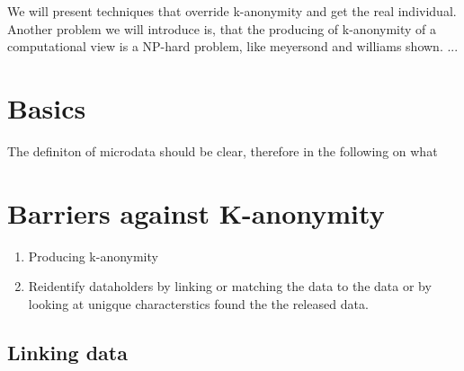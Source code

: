 \documentclass{llncs}
\begin{document}
We will present techniques that override k-anonymity and get the real individual. Another problem we will introduce is, that the producing of k-anonymity of a computational view is a NP-hard problem, like  meyersond and williams shown.
...
\section{Basics}
The definiton of microdata should be clear, therefore in the following on what 
\section{Barriers against K-anonymity}
\begin{enumerate}
	\item Producing k-anonymity
	\item Reidentify dataholders by linking or matching the data to the data or by looking at unigque characterstics found the the released data.
\end{enumerate}
\cite{maheshwarkar2011privacy}
\subsection{Linking data}
\end{document}
